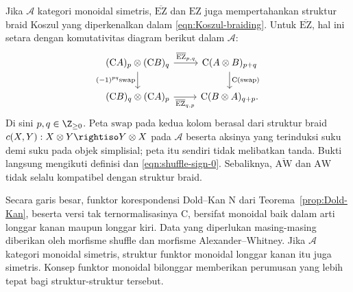 \begin{remark}
	Jika $\mathcal{A}$ kategori monoidal simetris,
	$\overline{\mathrm{EZ}}$ dan $\mathrm{EZ}$ juga mempertahankan struktur
	braid Koszul yang diperkenalkan dalam \eqref{eqn:Koszul-braiding}.
	Untuk $\overline{\mathrm{EZ}}$, hal ini setara dengan komutativitas
	diagram berikut dalam $\mathcal{A}$:
	\[\begin{tikzcd}
		(\mathrm{C}A)_p \otimes (\mathrm{C}B)_q \arrow[r, "{\overline{\mathrm{EZ}}_{p, q}}"] \arrow[d, "{(-1)^{pq} \mathrm{swap}}"'] & \mathrm{C}(A \otimes B)_{p+q} \arrow[d, "{\mathrm{C}(\mathrm{swap})}"] \\
		(\mathrm{C}B)_q \otimes (\mathrm{C}A)_p \arrow[r, "{\overline{\mathrm{EZ}}_{q, p}}"'] & \mathrm{C}(B \otimes A)_{q+p}.
	\end{tikzcd}\]
	Di sini $p,q\in\Z_{\geq0}$. Peta $\mathrm{swap}$ pada kedua kolom
	berasal dari struktur braid
	$c(X,Y):X\otimes Y\rightiso Y\otimes X$ pada $\mathcal{A}$ beserta
	aksinya yang terinduksi suku demi suku pada objek simplisial; peta
	itu sendiri tidak melibatkan tanda. Bukti langsung mengikuti definisi
	dan \eqref{eqn:shuffle-sign-0}. Sebaliknya,
	$\overline{\mathrm{AW}}$ dan $\mathrm{AW}$ tidak selalu kompatibel
	dengan struktur braid.

	Secara garis besar, funktor korespondensi Dold--Kan $\mathrm{N}$ dari
	Teorema~\ref{prop:Dold-Kan}, beserta versi tak ternormalisasinya
	$\mathrm{C}$, bersifat monoidal baik dalam arti longgar kanan maupun
	longgar kiri. Data yang diperlukan masing-masing diberikan oleh
	morfisme shuffle dan morfisme Alexander--Whitney. Jika $\mathcal{A}$
	kategori monoidal simetris, struktur funktor monoidal longgar kanan itu
	juga simetris. Konsep funktor monoidal bilonggar
	\cite[Chapters 3, 5]{AM10} memberikan perumusan yang lebih tepat bagi
	struktur-struktur tersebut.

\end{remark}
